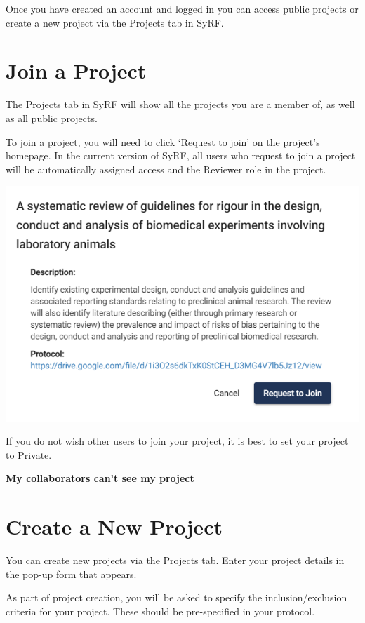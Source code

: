 \documentclass[
]{book}
\begin{document}
Once you have created an account and logged in you can access public projects or create a new project via the Projects tab in SyRF.

\hypertarget{join}{%
\chapter{Join a Project}\label{join}}

The Projects tab in SyRF will show all the projects you are a member of, as well as all public projects.

To join a project, you will need to click `Request to join' on the project's homepage. In the current version of SyRF, all users who request to join a project will be automatically assigned access and the Reviewer role in the project.

\includegraphics[width=9.83in]{figs/Fig_Request_to_join}

If you do not wish other users to join your project, it is best to set your project to Private.

\href{https://syrf.org.uk/faq}{\textbf{My collaborators can't see my project}}

\hypertarget{createProject}{%
\chapter{Create a New Project}\label{createProject}}

You can create new projects via the Projects tab. Enter your project details in the pop-up form that appears.

As part of project creation, you will be asked to specify the inclusion/exclusion criteria for your project. These should be pre-specified in your protocol.
\end{document}
